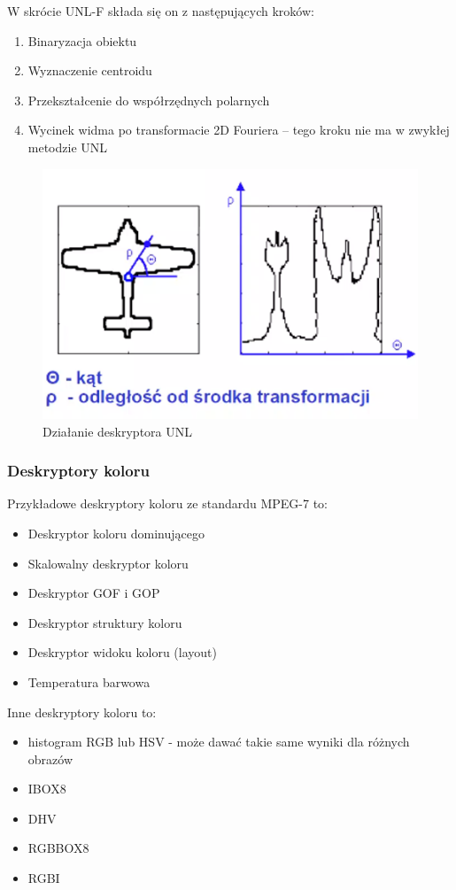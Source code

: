 \documentclass[wi]{zut}
\begin{document}
W skrócie UNL-F składa się on z następujących kroków:

\begin{enumerate}
    \item Binaryzacja obiektu
    \item Wyznaczenie centroidu
    \item Przekształcenie do współrzędnych polarnych
    \item Wycinek widma po transformacie 2D Fouriera -- tego kroku nie ma w zwykłej metodzie UNL
\end{enumerate}

\begin{figure}[H]
    \centering
    \includegraphics[width=0.5\linewidth]{images/unl.png}
    \caption{Działanie deskryptora UNL}
    \label{fig:unl}
\end{figure}

\subsubsection{Deskryptory koloru}

Przykładowe deskryptory koloru ze standardu MPEG-7 to:

\begin{itemize}
    \item Deskryptor koloru dominującego
    \item Skalowalny deskryptor koloru
    \item Deskryptor GOF i GOP
    \item Deskryptor struktury koloru
    \item Deskryptor widoku koloru (layout)
    \item Temperatura barwowa \cite{Frejlichowski2020_6}
\end{itemize}

Inne deskryptory koloru to:

\begin{itemize}
\item histogram RGB lub HSV - może dawać takie same wyniki dla różnych obrazów
\item IBOX8
\item DHV
\item RGBBOX8
\item RGBI \cite{Frejlichowski2020_6}
\end{itemize}
\end{document}
